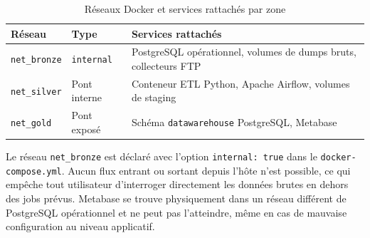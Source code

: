\documentclass[12pt, a4paper]{report}
\begin{document}
\begin{itemize}[label=\textcolor{chuBlue}{\textbullet}]
\begin{table}[htbp]
\centering\footnotesize\renewcommand{\arraystretch}{1.5}
\begin{tabularx}{\linewidth}{@{} L{3.2cm} L{2.0cm} X @{}}
\toprule
{}
\textbf{Réseau} & \textbf{Type} & \textbf{Services rattachés} \\
\midrule
\texttt{net\_bronze} & \texttt{internal} &
PostgreSQL opérationnel, volumes de dumps bruts, collecteurs FTP \\
\texttt{net\_silver} & Pont interne &
Conteneur ETL Python, Apache Airflow, volumes de staging \\
\texttt{net\_gold} & Pont exposé &
Schéma \texttt{datawarehouse} PostgreSQL, Metabase \\
\bottomrule
\end{tabularx}
\caption{Réseaux Docker et services rattachés par zone}
\label{tab:docker_networks}
\end{table}

Le réseau \texttt{net\_bronze} est déclaré avec l'option \texttt{internal: true} dans le \texttt{docker-compose.yml}. Aucun flux entrant ou sortant depuis l'hôte n'est possible, ce qui empêche tout utilisateur d'interroger directement les données brutes en dehors des jobs prévus. Metabase se trouve physiquement dans un réseau différent de PostgreSQL opérationnel et ne peut pas l'atteindre, même en cas de mauvaise configuration au niveau applicatif.

\begin{figure}[H]
  \centering
\end{figure}
\end{itemize}
\end{document}
